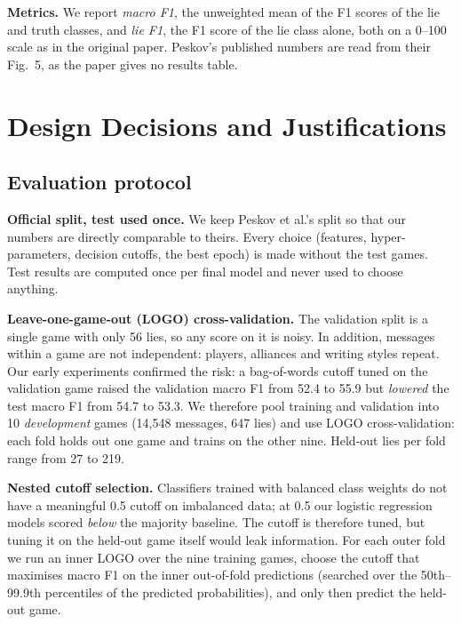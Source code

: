 \documentclass[conference]{IEEEtran}
\begin{document}
\textbf{Metrics.} We report \emph{macro F1}, the unweighted mean of the F1 scores of the lie and truth classes, and \emph{lie F1}, the F1 score of the lie class alone, both on a 0--100 scale as in the original paper. Peskov's published numbers are read from their Fig.~5, as the paper gives no results table.

\section{Design Decisions and Justifications}
\label{sec:design}

\subsection{Evaluation protocol}
\label{sec:design-eval}
\textbf{Official split, test used once.} We keep Peskov et al.'s split so that our numbers are directly comparable to theirs. Every choice (features, hyper-parameters, decision cutoffs, the best epoch) is made without the test games. Test results are computed once per final model and never used to choose anything.

\textbf{Leave-one-game-out (LOGO) cross-validation.} The validation split is a single game with only 56 lies, so any score on it is noisy. In addition, messages within a game are not independent: players, alliances and writing styles repeat. Our early experiments confirmed the risk: a bag-of-words cutoff tuned on the validation game raised the validation macro F1 from 52.4 to 55.9 but \emph{lowered} the test macro F1 from 54.7 to 53.3. We therefore pool training and validation into 10 \emph{development} games (14,548 messages, 647 lies) and use LOGO cross-validation: each fold holds out one game and trains on the other nine. Held-out lies per fold range from 27 to 219.

\textbf{Nested cutoff selection.} Classifiers trained with balanced class weights do not have a meaningful 0.5 cutoff on imbalanced data; at 0.5 our logistic regression models scored \emph{below} the majority baseline. The cutoff is therefore tuned, but tuning it on the held-out game itself would leak information. For each outer fold we run an inner LOGO over the nine training games, choose the cutoff that maximises macro F1 on the inner out-of-fold predictions (searched over the 50th--99.9th percentiles of the predicted probabilities), and only then predict the held-out game.
\end{document}
